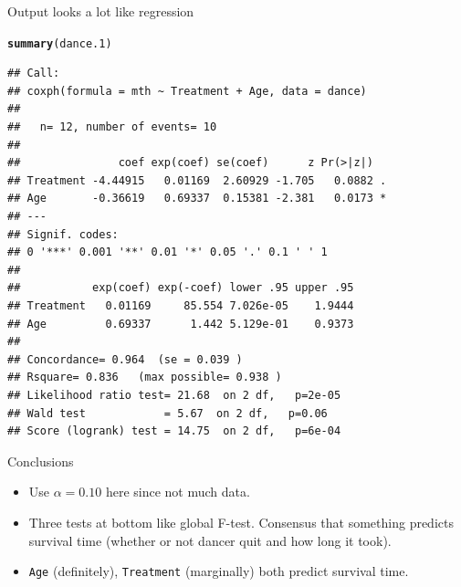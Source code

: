 \documentclass[unknownkeysallowed]{beamer}\usepackage[]{graphicx}\usepackage[]{color}
\makeatletter
\newcommand{\hlstd}[1]{\textcolor[rgb]{0.345,0.345,0.345}{#1}}%
\newcommand{\hlkwd}[1]{\textcolor[rgb]{0.737,0.353,0.396}{\textbf{#1}}}%
\newenvironment{kframe}{%
 \def\at@end@of@kframe{}%
 \ifinner\ifhmode%
  \def\at@end@of@kframe{\end{minipage}}%
  \begin{minipage}{\columnwidth}%
 \fi\fi%
 \def\FrameCommand##1{\hskip\@totalleftmargin \hskip-\fboxsep
 \colorbox{shadecolor}{##1}\hskip-\fboxsep
     \hskip-\linewidth \hskip-\@totalleftmargin \hskip\columnwidth}%
 \MakeFramed {\advance\hsize-\width
   \@totalleftmargin\z@ \linewidth\hsize
   \@setminipage}}%
 {\par\unskip\endMakeFramed%
 \at@end@of@kframe}
\newenvironment{knitrout}{}{} %
\makeatother
\begin{document}
\begin{frame}[fragile]{Output looks a lot like regression}

 
\begin{knitrout}\scriptsize
{}\color{fgcolor}\begin{kframe}
\begin{alltt}
\hlkwd{summary}\hlstd{(dance.1)}
\end{alltt}
\begin{verbatim}
## Call:
## coxph(formula = mth ~ Treatment + Age, data = dance)
## 
##   n= 12, number of events= 10 
## 
##               coef exp(coef) se(coef)      z Pr(>|z|)  
## Treatment -4.44915   0.01169  2.60929 -1.705   0.0882 .
## Age       -0.36619   0.69337  0.15381 -2.381   0.0173 *
## ---
## Signif. codes:  
## 0 '***' 0.001 '**' 0.01 '*' 0.05 '.' 0.1 ' ' 1
## 
##           exp(coef) exp(-coef) lower .95 upper .95
## Treatment   0.01169     85.554 7.026e-05    1.9444
## Age         0.69337      1.442 5.129e-01    0.9373
## 
## Concordance= 0.964  (se = 0.039 )
## Rsquare= 0.836   (max possible= 0.938 )
## Likelihood ratio test= 21.68  on 2 df,   p=2e-05
## Wald test            = 5.67  on 2 df,   p=0.06
## Score (logrank) test = 14.75  on 2 df,   p=6e-04
\end{verbatim}
\end{kframe}
\end{knitrout}
  
\end{frame}

\begin{frame}[fragile]{Conclusions}

  \begin{itemize}
  \item Use $\alpha=0.10$ here since not much data.
  \item Three tests at bottom like global F-test. Consensus that
    something predicts survival time (whether or not dancer quit and how
    long it took).
  \item \texttt{Age} (definitely), \texttt{Treatment} (marginally) both
    predict survival time.
  \end{itemize}


  
\end{frame}
\end{document}
